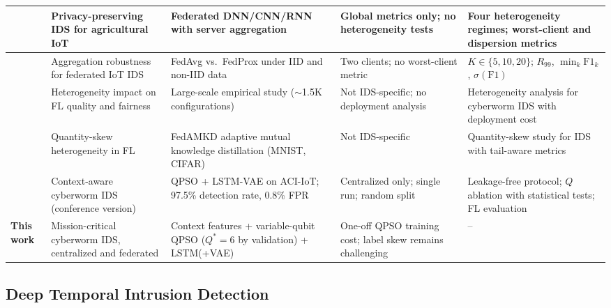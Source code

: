 \documentclass[conference]{IEEEtran}
\begin{document}
\begin{table}[!htbp]
\begin{tabular}{>{\raggedright\arraybackslash}p{1.0cm} >{\raggedright\arraybackslash}p{2.6cm} >{\raggedright\arraybackslash}p{4.0cm} >{\raggedright\arraybackslash}p{3.2cm} >{\raggedright\arraybackslash}p{4.4cm}}
\midrule

\cite{FRIHA202217} & Privacy-preserving IDS for agricultural IoT & Federated DNN/CNN/RNN with server aggregation & Global metrics only; no heterogeneity tests & Four heterogeneity regimes; worst-client and dispersion metrics \\

\midrule

\cite{herlambangfederated} & Aggregation robustness for federated IoT IDS & FedAvg vs.\ FedProx under IID and non-IID data & Two clients; no worst-client metric & $K\in\{5,10,20\}$; $R_{99}$, $\min_k\mathrm{F1}_k$, $\sigma(\mathrm{F1})$ \\

\midrule

\cite{abdelmoniemcomprehensive} & Heterogeneity impact on FL quality and fairness & Large-scale empirical study (${\sim}$1.5K configurations) & Not IDS-specific; no deployment analysis & Heterogeneity analysis for cyberworm IDS with deployment cost \\

\midrule

\cite{gefedamkd} & Quantity-skew heterogeneity in FL & FedAMKD adaptive mutual knowledge distillation (MNIST, CIFAR) & Not IDS-specific & Quantity-skew study for IDS with tail-aware metrics \\

\midrule

\cite{ajakweconquest} & Context-aware cyberworm IDS (conference version) & QPSO + LSTM-VAE on ACI-IoT; 97.5\% detection rate, 0.8\% FPR & Centralized only; single run; random split & Leakage-free protocol; $Q$ ablation with statistical tests; FL evaluation \\

\midrule

\textbf{This work} & Mission-critical cyberworm IDS, centralized and federated & Context features + variable-qubit QPSO ($Q^{*}{=}6$ by validation) + LSTM(+VAE) & One-off QPSO training cost; label skew remains challenging & -- \\

\hline\toprule
\end{tabular}
\end{table}

\subsection{Deep Temporal Intrusion Detection}
\end{document}
